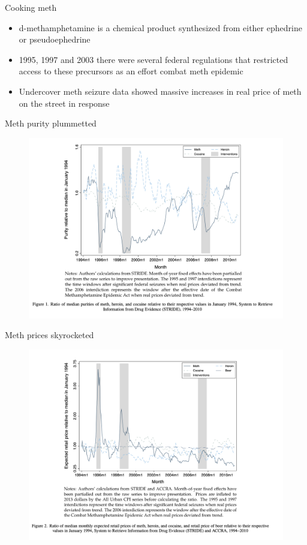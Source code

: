 \documentclass{beamer}
\begin{document}
\begin{frame}{Cooking meth}

\begin{itemize}
\item d-methamphetamine is a chemical product synthesized from either ephedrine or pseudoephedrine 
\item 1995, 1997 and 2003 there were several federal regulations that restricted access to these precursors as an effort combat meth epidemic
\item Undercover meth seizure data showed massive increases in real price of meth on the street in response
\end{itemize}

\end{frame}

\begin{frame}{Meth purity plummetted}

	\begin{figure}
	\includegraphics[scale=0.35]{./lecture_includes/he_2}
	\end{figure}
\end{frame}

\begin{frame}{Meth prices skyrocketed}

	\begin{figure}
	\includegraphics[scale=0.35]{./lecture_includes/he_3}
	\end{figure}
\end{frame}
\end{document}
